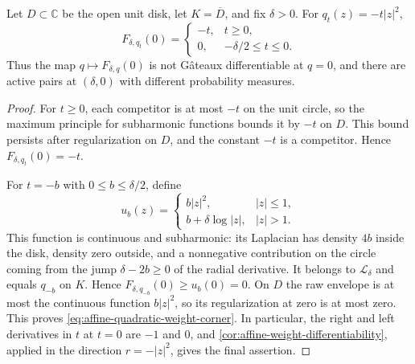 \begin{example}\label{ex:affine-quadratic-weight-corner}
Let $D\subset\mathbb C$ be the open unit disk, let $K=\overline D$, and fix $\delta>0$. For $q_t(z)=-t|z|^2$,
\begin{equation}\label{eq:affine-quadratic-weight-corner}
 F_{\delta,q_t}(0)=
 \begin{cases}
 -t,&t\geq0,\\
 0,&-\delta/2\leq t\leq0.
 \end{cases}
\end{equation}
Thus the map $q\mapsto F_{\delta,q}(0)$ is not G\^ateaux differentiable at $q=0$, and there are active pairs at $(\delta,0)$ with different probability measures.
\end{example}
\begin{proof}
For $t\geq0$, each competitor is at most $-t$ on the unit circle, so the maximum principle for subharmonic functions bounds it by $-t$ on $D$. This bound persists after regularization on $D$, and the constant $-t$ is a competitor. Hence $F_{\delta,q_t}(0)=-t$.

For $t=-b$ with $0\leq b\leq\delta/2$, define
\[
 u_b(z)=
 \begin{cases}
 b|z|^2,&|z|\leq1,\\
 b+\delta\log|z|,&|z|>1.
 \end{cases}
\]
This function is continuous and subharmonic: its Laplacian has density $4b$ inside the disk, density zero outside, and a nonnegative contribution on the circle coming from the jump $\delta-2b\geq0$ of the radial derivative. It belongs to $\mathcal L_\delta$ and equals $q_{-b}$ on $K$. Hence $F_{\delta,q_{-b}}(0)\geq u_b(0)=0$. On $D$ the raw envelope is at most the continuous function $b|z|^2$, so its regularization at zero is at most zero. This proves \eqref{eq:affine-quadratic-weight-corner}. In particular, the right and left derivatives in $t$ at $t=0$ are $-1$ and $0$, and \cref{cor:affine-weight-differentiability}, applied in the direction $r=-|z|^2$, gives the final assertion.
\end{proof}
